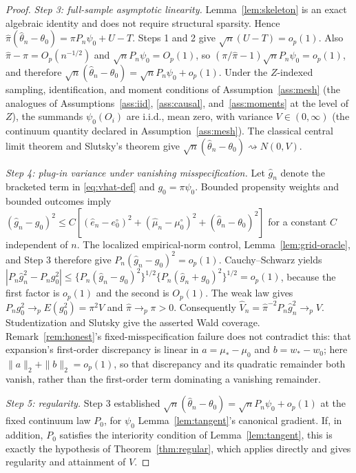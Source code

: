 \documentclass[11pt]{article}
\theoremstyle{plain}
\theoremstyle{definition}
\theoremstyle{remark}
\newcommand{\ez}{e_0}
\newcommand{\mz}{\mu_0}
\begin{document}
\begin{proof}
\emph{Step 3: full-sample asymptotic linearity.} Lemma~\ref{lem:skeleton}
is an exact algebraic identity and does not require structural sparsity.
Hence $\widehat\pi(\widehat\theta_n-\theta_0)=\pi P_n\psi_0+U-T$. Steps 1
and 2 give $\sqrt n(U-T)=o_p(1)$. Also $\widehat\pi-\pi=O_p(n^{-1/2})$ and
$\sqrt nP_n\psi_0=O_p(1)$, so
$(\pi/\widehat\pi-1)\sqrt nP_n\psi_0=o_p(1)$, and therefore
$\sqrt n(\widehat\theta_n-\theta_0)=\sqrt nP_n\psi_0+o_p(1)$. Under the
$Z$-indexed sampling, identification, and moment conditions of
Assumption~\ref{ass:mesh} (the analogues of
Assumptions~\ref{ass:iid}, \ref{ass:causal}, and~\ref{ass:moments} at the
level of $Z$), the summands $\psi_0(O_i)$ are i.i.d., mean zero, with
variance $V\in(0,\infty)$ (the continuum quantity declared in
Assumption~\ref{ass:mesh}). The classical central limit theorem and
Slutsky's theorem give
$\sqrt n(\widehat\theta_n-\theta_0)\rightsquigarrow N(0,V)$.

\emph{Step 4: plug-in variance under vanishing misspecification.} Let
$\widehat g_n$ denote the bracketed term in \eqref{eq:vhat-def} and
$g_0=\pi\psi_0$. Bounded propensity weights and bounded outcomes imply
$(\widehat g_n-g_0)^2\le C[(\widehat e_n-\ez^\circ)^2
+(\widehat\mu_n-\mz^\circ)^2+(\widehat\theta_n-\theta_0)^2]$ for a constant
$C$ independent of $n$. The localized empirical-norm control,
Lemma~\ref{lem:grid-oracle}, and Step 3 therefore give
$P_n(\widehat g_n-g_0)^2=o_p(1)$. Cauchy--Schwarz yields
$|P_n\widehat g_n^2-P_ng_0^2|
\le\{P_n(\widehat g_n-g_0)^2\}^{1/2}\{P_n(\widehat g_n+g_0)^2\}^{1/2}
=o_p(1)$, because the first factor is $o_p(1)$ and the second is $O_p(1)$.
The weak law gives $P_ng_0^2\to_pE(g_0^2)=\pi^2V$ and
$\widehat\pi\to_p\pi>0$. Consequently
$\widehat V_n=\widehat\pi^{-2}P_n\widehat g_n^2\to_pV$. Studentization and
Slutsky give the asserted Wald coverage. Remark~\ref{rem:honest}'s
fixed-misspecification failure does not contradict this: that expansion's
first-order discrepancy is linear in $a=\mu_*-\mz$ and $b=w_*-w_0$; here
$\|a\|_2+\|b\|_2=o_p(1)$, so that discrepancy and its quadratic remainder
both vanish, rather than the first-order term dominating a vanishing
remainder.

\emph{Step 5: regularity.} Step 3 established
$\sqrt n(\widehat\theta_n-\theta_0)=\sqrt nP_n\psi_0+o_p(1)$ at the fixed
continuum law $P_0$, for $\psi_0$ Lemma~\ref{lem:tangent}'s canonical
gradient. If, in addition, $P_0$ satisfies the interiority condition of
Lemma~\ref{lem:tangent}, this is exactly the hypothesis of
Theorem~\ref{thm:regular}, which applies directly and gives regularity and
attainment of $V$.
\end{proof}
\end{document}

